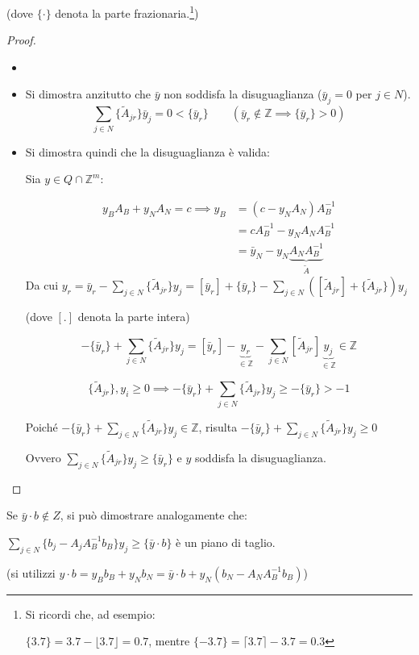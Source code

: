 \documentclass[a4paper,11pt]{book}
\newcommand{\integers}{\mathbb{Z}}
\newcommand{\dsum}{\displaystyle\sum}
\theoremstyle{break}
\begin{document}
(dove $\{\cdot\}$ denota la parte frazionaria.\footnote{Si ricordi che, ad esempio:

$\{3.7\} = 3.7 - \lfloor 3.7 \rfloor = 0.7$, mentre $\{-3.7\} = \lceil 3.7 \rceil - 3.7 = 0.3$})
\newpage
\begin{proof}
\begin{itemize}\small
 \item[]
 \item Si dimostra anzitutto che $\bar y$ non soddisfa la disuguaglianza ($\bar y_j = 0$ per $j \in N$).
 \[\sum_{j \in N} \{\tilde A_{jr}\} \bar y_j = 0 < \{\bar y_r\} \quad\quad (\bar y_r \notin \integers \implies \{\bar y_r\} > 0)\]
 \item Si dimostra quindi che la disuguaglianza è valida:
 
 Sia $y \in Q \cap \integers^m$:
 
 \[\begin{aligned}
    y_BA_B + y_NA_N = c \implies y_B &= (c-y_N A_N)A^{-1}_B\\
                                     &= cA^{-1}_B - y_N A_N A^{-1}_B\\
                                     &= \bar y_N - y_N \underbrace{A_N A^{-1}_B}_{\tilde A}
   \end{aligned}
\]
Da cui $y_r = \bar y_r - \dsum_{j \in N} \{\tilde A_{jr}\}y_j = [\bar y_r] + \{\bar y_r\} - \dsum_{j \in N} ([\tilde A_{jr}] + \{\tilde A_{jr}\})y_j$

(dove $[.]$ denota la parte intera)

\[-\{ \bar y_r \} + \dsum_{j \in N} \{ \tilde A_{jr} \} y_j = [\bar y_r] - \underbrace{y_r}_{\in \integers} - \dsum_{j \in N} [\tilde A_{jr}] \underbrace{y_j}_{\in \integers} \in \integers\]

\[\{\tilde A_{jr}\}, y_i \geq 0 \implies -\{\bar y_r\} + \dsum_{j \in N} \{\tilde A_{jr}\} y_j \geq -\{ \bar y_r \} > -1\]

Poiché $-\{\bar y_r\} + \sum\limits_{j \in N} \{\tilde A_{jr}\} y_j \in \integers$, risulta $-\{\bar y_r\} + \sum\limits_{j \in N} \{\tilde A_{jr}\} y_j \geq 0$

Ovvero $\sum\limits_{j \in N} \{\tilde A_{jr}\} y_j \geq \{\bar y_r\}$ e $y$ soddisfa la disuguaglianza.
\end{itemize}

\end{proof}
{\footnotesize

Se $\bar y \cdot b \notin Z$, si può dimostrare analogamente che:

\begin{center}
 $\dsum_{j \in N} \{b_j - A_j A^{-1}_Bb_B\} y_j \geq \{\bar y \cdot b\}$ è un piano di taglio.\smallskip
 
 (si utilizzi $y\cdot b = y_Bb_B + y_Nb_N = \bar y \cdot b + y_N(b_N - A_N A^{-1}_Bb_B)$)
\end{center}



}\bigskip
\end{document}
